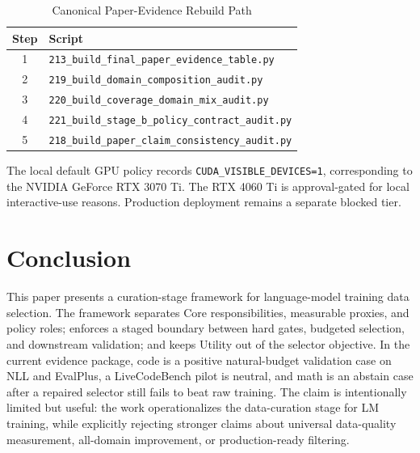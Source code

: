 \documentclass[conference]{IEEEtran}
\begin{document}
\begin{table}[t]
\caption{Canonical Paper-Evidence Rebuild Path}
\label{tab:canonicalpath}
\centering
\footnotesize
\begin{tabular}{cl}
\toprule
Step & Script \\
\midrule
1 & \texttt{213\_build\_final\_paper\_evidence\_table.py} \\
2 & \texttt{219\_build\_domain\_composition\_audit.py} \\
3 & \texttt{220\_build\_coverage\_domain\_mix\_audit.py} \\
4 & \texttt{221\_build\_stage\_b\_policy\_contract\_audit.py} \\
5 & \texttt{218\_build\_paper\_claim\_consistency\_audit.py} \\
\bottomrule
\end{tabular}
\end{table}

The local default GPU policy records \texttt{CUDA\_VISIBLE\_DEVICES=1},
corresponding to the NVIDIA GeForce RTX 3070 Ti.  The RTX 4060 Ti is
approval-gated for local interactive-use reasons.  Production deployment
remains a separate blocked tier.

\section{Conclusion}
This paper presents a curation-stage framework for language-model training data
selection.  The framework separates Core responsibilities, measurable proxies,
and policy roles; enforces a staged boundary between hard gates, budgeted
selection, and downstream validation; and keeps Utility out of the selector
objective.  In the current evidence package, code is a positive natural-budget
validation case on NLL and EvalPlus, a LiveCodeBench pilot is neutral, and math
is an abstain case after a repaired selector still fails to beat raw training.
The claim is intentionally limited but useful:
the work operationalizes the data-curation stage for LM training, while
explicitly rejecting stronger claims about universal data-quality measurement,
all-domain improvement, or production-ready filtering.
\end{document}

